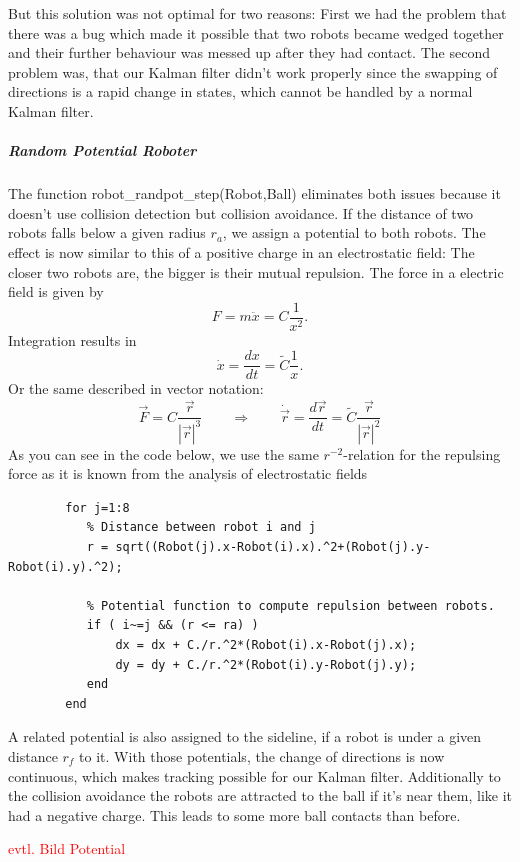 But this solution was not optimal for two reasons: First we had the problem that there was a bug which made it possible that two robots became wedged together and their further behaviour was messed up after they had contact. The second problem was, that our Kalman filter didn't work properly since the swapping of directions is a rapid change in states, which cannot be handled by a normal Kalman filter. 

\subparagraph{Random Potential Roboter} 
The function {\selectfont robot\_randpot\_step(Robot,Ball)} eliminates both issues because it doesn't use collision detection but collision avoidance. If the distance of two robots falls below a given radius $r_a$, we assign a potential to both robots. The effect is now similar to this of a positive charge in an electrostatic field: The closer two robots are, the bigger is their mutual repulsion. The force in a electric field is given by
	\[ F = m\ddot{x} = C \frac{1}{x^2}.
	\]
Integration results in
	\[ \dot{x} = \frac{dx}{dt} = \tilde{C} \frac{1}{x}.\]
Or the same described in vector notation:
	\[	\vec{F} = C \frac{\vec{r}}{|\vec{r}|^3} \qquad \Rightarrow \qquad \dot{\vec{r}} = \frac{d \vec{r}}{dt} = %
			\tilde{C} \frac{\vec{r}}{|\vec{r}|^2} %
	\]
As you can see in the code below, we use the same \(r^{-2}\)-relation for the repulsing force as it is known from the analysis of electrostatic fields
\begin{lstlisting}
        for j=1:8
           % Distance between robot i and j
           r = sqrt((Robot(j).x-Robot(i).x).^2+(Robot(j).y-Robot(i).y).^2);
            
           % Potential function to compute repulsion between robots.
           if ( i~=j && (r <= ra) )
               dx = dx + C./r.^2*(Robot(i).x-Robot(j).x);
               dy = dy + C./r.^2*(Robot(i).y-Robot(j).y);
           end
        end
\end{lstlisting}

A related potential is also assigned to the sideline, if a robot is under a given distance $r_f$ to it. With those potentials, the change of directions is now continuous, which makes tracking possible for our Kalman filter. Additionally to the collision avoidance the robots are attracted to the ball if it's near them, like it had a negative charge. This leads to some more ball contacts than before.

\textcolor{red}{evtl. Bild Potential}



